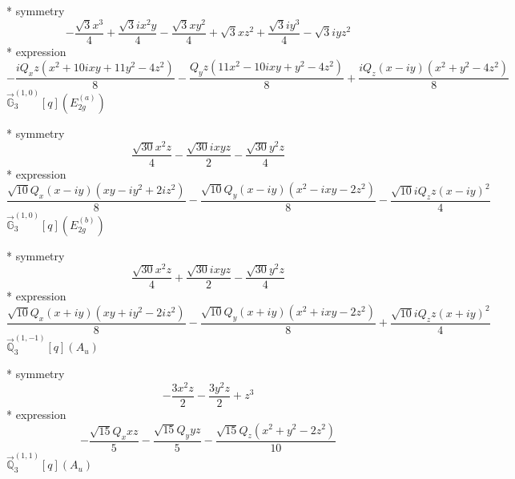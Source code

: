 \documentclass[fleqn,8pt]{jsarticle}
\begin{document}
\noindent\quad ** symmetry
\begin{dmath*}
- \frac{\sqrt{3} x^{3}}{4} + \frac{\sqrt{3} i x^{2} y}{4} - \frac{\sqrt{3} x y^{2}}{4} + \sqrt{3} x z^{2} + \frac{\sqrt{3} i y^{3}}{4} - \sqrt{3} i y z^{2}
\end{dmath*}
\noindent\quad ** expression
\begin{dmath*}
- \frac{i Q_{x} z \left(x^{2} + 10 i x y + 11 y^{2} - 4 z^{2}\right)}{8} - \frac{Q_{y} z \left(11 x^{2} - 10 i x y + y^{2} - 4 z^{2}\right)}{8} + \frac{i Q_{z} \left(x - i y\right) \left(x^{2} + y^{2} - 4 z^{2}\right)}{8}
\end{dmath*}
\noindent\quad $\vec{\mathbb{G}}_{3}^{(1,0)}[q](E_{2g}^{(a)})$

\noindent\quad ** symmetry
\begin{dmath*}
\frac{\sqrt{30} x^{2} z}{4} - \frac{\sqrt{30} i x y z}{2} - \frac{\sqrt{30} y^{2} z}{4}
\end{dmath*}
\noindent\quad ** expression
\begin{dmath*}
\frac{\sqrt{10} Q_{x} \left(x - i y\right) \left(x y - i y^{2} + 2 i z^{2}\right)}{8} - \frac{\sqrt{10} Q_{y} \left(x - i y\right) \left(x^{2} - i x y - 2 z^{2}\right)}{8} - \frac{\sqrt{10} i Q_{z} z \left(x - i y\right)^{2}}{4}
\end{dmath*}
\noindent\quad $\vec{\mathbb{G}}_{3}^{(1,0)}[q](E_{2g}^{(b)})$

\noindent\quad ** symmetry
\begin{dmath*}
\frac{\sqrt{30} x^{2} z}{4} + \frac{\sqrt{30} i x y z}{2} - \frac{\sqrt{30} y^{2} z}{4}
\end{dmath*}
\noindent\quad ** expression
\begin{dmath*}
\frac{\sqrt{10} Q_{x} \left(x + i y\right) \left(x y + i y^{2} - 2 i z^{2}\right)}{8} - \frac{\sqrt{10} Q_{y} \left(x + i y\right) \left(x^{2} + i x y - 2 z^{2}\right)}{8} + \frac{\sqrt{10} i Q_{z} z \left(x + i y\right)^{2}}{4}
\end{dmath*}
\noindent\quad $\vec{\mathbb{Q}}_{3}^{(1,-1)}[q](A_{u})$

\noindent\quad ** symmetry
\begin{dmath*}
- \frac{3 x^{2} z}{2} - \frac{3 y^{2} z}{2} + z^{3}
\end{dmath*}
\noindent\quad ** expression
\begin{dmath*}
- \frac{\sqrt{15} Q_{x} x z}{5} - \frac{\sqrt{15} Q_{y} y z}{5} - \frac{\sqrt{15} Q_{z} \left(x^{2} + y^{2} - 2 z^{2}\right)}{10}
\end{dmath*}
\noindent\quad $\vec{\mathbb{Q}}_{3}^{(1,1)}[q](A_{u})$
\end{document}
